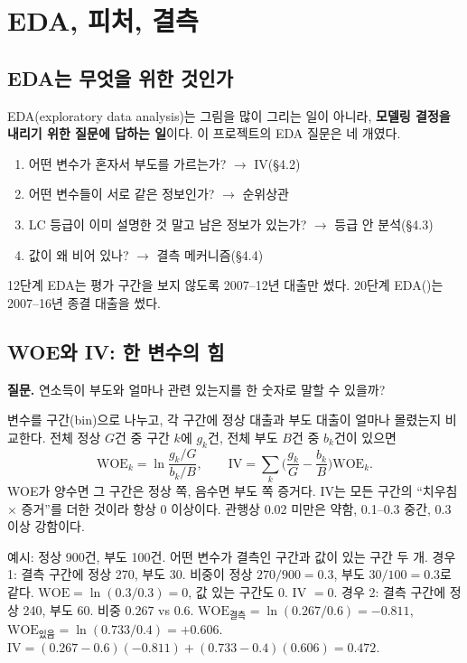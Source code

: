 \chapter{EDA, 피처, 결측}

\section{EDA는 무엇을 위한 것인가}
EDA(exploratory data analysis)는 그림을 많이 그리는 일이 아니라, \textbf{모델링 결정을 내리기 위한 질문에 답하는 일}이다. 이 프로젝트의 EDA 질문은 네 개였다.
\begin{enumerate}[leftmargin=*]
\item 어떤 변수가 혼자서 부도를 가르는가? \ensuremath{\to} IV(\S4.2)
\item 어떤 변수들이 서로 같은 정보인가? \ensuremath{\to} 순위상관
\item LC 등급이 이미 설명한 것 말고 남은 정보가 있는가? \ensuremath{\to} 등급 안 분석(\S4.3)
\item 값이 왜 비어 있나? \ensuremath{\to} 결측 메커니즘(\S4.4)
\end{enumerate}
12단계 EDA는 평가 구간을 보지 않도록 2007--12년 대출만 썼다. 20단계 EDA()는 2007--16년 종결 대출을 썼다.

\section{WOE와 IV: 한 변수의 힘}
\textbf{질문.} 연소득이 부도와 얼마나 관련 있는지를 한 숫자로 말할 수 있을까?

변수를 구간(bin)으로 나누고, 각 구간에 정상 대출과 부도 대출이 얼마나 몰렸는지 비교한다. 전체 정상 $G$건 중 구간 $k$에 $g_k$건, 전체 부도 $B$건 중 $b_k$건이 있으면
\[
\mathrm{WOE}_k=\ln\frac{g_k/G}{b_k/B},\qquad
\mathrm{IV}=\sum_k\Big(\frac{g_k}{G}-\frac{b_k}{B}\Big)\mathrm{WOE}_k .
\]
WOE가 양수면 그 구간은 정상 쪽, 음수면 부도 쪽 증거다. IV는 모든 구간의 ``치우침 \ensuremath{\times} 증거''를 더한 것이라 항상 0 이상이다. 관행상 0.02 미만은 약함, 0.1--0.3 중간, 0.3 이상 강함이다.

\begin{workout}
 예시: 정상 900건, 부도 100건. 어떤 변수가 결측인 구간과 값이 있는 구간 두 개.
 경우 1: 결측 구간에 정상 270, 부도 30. 비중이 정상 $270/900=0.3$, 부도 $30/100=0.3$로 같다.
$\mathrm{WOE}=\ln(0.3/0.3)=0$, 값 있는 구간도 0. IV $=0$. 
 경우 2: 결측 구간에 정상 240, 부도 60. 비중 $0.267$ vs $0.6$.
$\mathrm{WOE}_{\text{결측}}=\ln(0.267/0.6)=-0.811$, $\mathrm{WOE}_{\text{있음}}=\ln(0.733/0.4)=+0.606$.
 $\mathrm{IV}=(0.267-0.6)(-0.811)+(0.733-0.4)(0.606)=0.472$. 
\end{workout}

